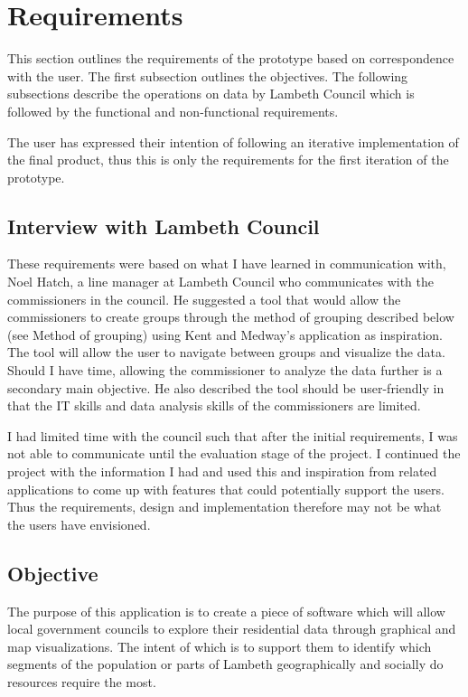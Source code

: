 \chapter{Requirements}

This section outlines the requirements of the prototype based on correspondence with the user. The first subsection outlines the objectives. The following subsections describe the operations on data by Lambeth Council which is followed by the functional and non-functional requirements.

The user has expressed their intention of following an iterative implementation of the final product, thus this is only the requirements for the first iteration of the prototype.

\section{Interview with Lambeth Council}
These requirements were based on what I have learned in communication with, Noel Hatch, a line manager at Lambeth Council who communicates with the commissioners in the council. He suggested a tool that would allow the commissioners to create groups through the method of grouping described below (see Method of grouping) using Kent and Medway’s application as inspiration. The tool will allow the user to navigate between groups and visualize the data. Should I have time, allowing the commissioner to analyze the data further is a secondary main objective. He also described the tool should be user-friendly in that the IT skills and data analysis skills of the commissioners are limited.\par

I had limited time with the council such that after the initial requirements, I was not able to communicate until the evaluation stage of the project. I continued the project with the information I had and used this and inspiration from related applications to come up with features that could potentially support the users. Thus the requirements, design and implementation therefore may not be what the users have envisioned.


\section{Objective}
The purpose of this application is to create a piece of software which will allow local government councils to explore their residential data through graphical and map visualizations. The intent of which is to support them to identify which segments of the population or parts of Lambeth geographically and socially do resources require the most.

